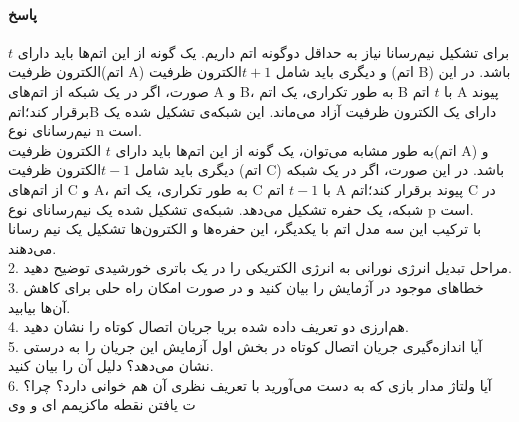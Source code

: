 \documentclass{article}
\begin{document}
\paragraph{پاسخ} برای تشکیل نیم‌رسانا نیاز به حداقل دو‌‌گونه اتم داریم.
یک گونه از این اتم‌ها باید دارای $t$ الکترون ظرفیت(اتم A) و دیگری باید شامل $t+1 $الکترون ظرفیت (اتم B) باشد. در این صورت، اگر در یک شبکه از اتم‌های A و B، به طور تکراری، یک اتم B با $t$ اتم A پیوند برقرار ‌کند؛اتمB دارای یک الکترون ظرفیت آزاد می‌ماند. این  شبکه‌ی تشکیل شده یک نیم‌رسانای نوع n است.\\
به طور مشابه می‌توان، یک گونه از این اتم‌ها باید دارای $t$ الکترون ظرفیت(اتم A) و دیگری باید شامل $t-1 $الکترون ظرفیت (اتم C) باشد. در این صورت، اگر در یک شبکه از اتم‌های C و A، به طور تکراری، یک اتم C با $t-1$ اتم A پیوند برقرار ‌کند؛اتم C در شبکه، یک حفره تشکیل می‌دهد‌. شبکه‌ی تشکیل شده یک نیم‌رسانای نوع p است.\\

با ترکیب این سه مدل اتم با یکدیگر، این حفره‌ها و الکترون‌ها تشکیل یک نیم رسانا می‌دهند. \\
2. مراحل تبدیل انرژی نورانی به انرژی الکتریکی را در یک باتری خورشیدی توضیح دهید.\\
3. خطاهای موجود در آژمایش را بیان کنید و در صورت امکان راه حلی برای کاهش آن‌ها بیابید.\\
4. هم‌ارزی دو تعریف داده شده بریا جریان اتصال کوتاه را نشان دهید.\\
5. آیا اندازه‌گیری جریان اتصال کوتاه در بخش اول آزمایش این جریان را به درستی نشان می‌دهد؟ دلیل آن را بیان کنید.\\
6. آیا ولتاژ مدار بازی که به دست می‌آورید با تعریف نظری آن هم خوانی دارد؟ چرا؟\\

ت یافتن نقطه ماکزیمم ای و وی
	
	
	
	
	
	
	
	
	
\end{document}
